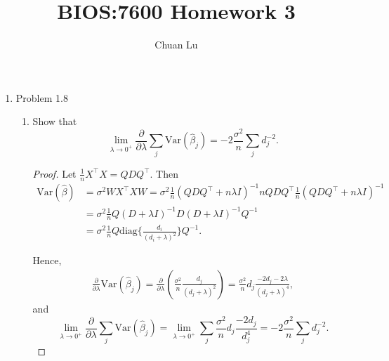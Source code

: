 \documentclass{article}
\begin{document}
\author{Chuan Lu}
\title{BIOS:7600 Homework 3}
\maketitle

\medskip

\begin{enumerate}

\item Problem 1.8

\begin{enumerate}
\item Show that 
$$
\lim_{\lambda\to 0^+} \frac{\partial}{\partial\lambda}\sum_{j}\text{Var}(\hat\beta_j) = -2\frac{\sigma^2}{n}\sum_{j}d_j^{-2}.
$$
\begin{proof}
Let $\frac{1}{n} X^\top X = QDQ^\top$. Then
$$
\begin{aligned}
\text{Var}(\hat\beta) &= \sigma^2WX^\top XW = \sigma^2\frac{1}{n}(QDQ^\top+n\lambda I)^{-1}nQDQ^\top \frac{1}{n}(QDQ^\top+n\lambda I)^{-1} \\
&= \sigma^2\frac{1}{n}Q(D+\lambda I)^{-1}D(D+\lambda I)^{-1}Q^{-1} \\
&= \sigma^2\frac{1}{n}Q \text{diag}\{\frac{d_i}{(d_i+\lambda)^2}\}Q^{-1}.
\end{aligned}
$$

Hence,
$$
\begin{aligned}
\frac{\partial}{\partial\lambda}\text{Var}(\hat\beta_j) = \frac{\partial}{\partial\lambda}\left(\frac{\sigma^2}{n}\frac{d_j}{(d_j+\lambda)^2} \right) = \frac{\sigma^2}{n}d_j\frac{-2d_j-2\lambda}{(d_j+\lambda)^4},
\end{aligned}
$$
and
$$
\lim_{\lambda\to 0^+}\frac{\partial}{\partial\lambda}\sum_{j}\text{Var}(\hat\beta_j) = \lim_{\lambda\to 0^+} \sum_j \frac{\sigma^2}{n}d_j\frac{-2d_j}{d_j^4} = -2\frac{\sigma^2}{n}\sum_{j}d_j^{-2}.
$$

\end{proof}


\end{enumerate}
\end{enumerate}
\end{document}
